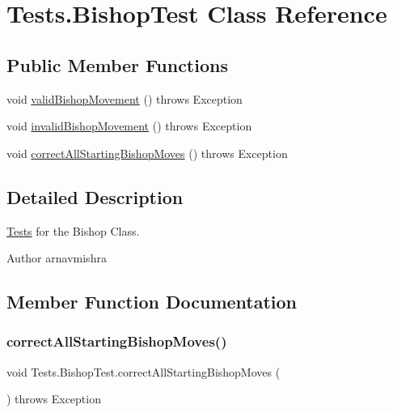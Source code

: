 \hypertarget{class_tests_1_1_bishop_test}{}\section{Tests.\+Bishop\+Test Class Reference}
\label{class_tests_1_1_bishop_test}
\subsection*{Public Member Functions}
\begin{DoxyCompactItemize}
\item 
void \hyperlink{class_tests_1_1_bishop_test_a5966af2d7a4cf4409a7c9e04e14be402}{valid\+Bishop\+Movement} ()  throws Exception 
\item 
void \hyperlink{class_tests_1_1_bishop_test_a3f1b2164ce04847f236b47960a2d6507}{invalid\+Bishop\+Movement} ()  throws Exception 
\item 
void \hyperlink{class_tests_1_1_bishop_test_a1635821930e814400c61693e0e65150c}{correct\+All\+Starting\+Bishop\+Moves} ()  throws Exception 
\end{DoxyCompactItemize}


\subsection{Detailed Description}
\hyperlink{namespace_tests}{Tests} for the Bishop Class. \begin{DoxyAuthor}{Author}
arnavmishra 
\end{DoxyAuthor}


\subsection{Member Function Documentation}
\hypertarget{class_tests_1_1_bishop_test_a1635821930e814400c61693e0e65150c}{}\label{class_tests_1_1_bishop_test_a1635821930e814400c61693e0e65150c} 
\subsubsection{\texorpdfstring{correct\+All\+Starting\+Bishop\+Moves()}{correctAllStartingBishopMoves()}}
{\footnotesize\ttfamily void Tests.\+Bishop\+Test.\+correct\+All\+Starting\+Bishop\+Moves (\begin{DoxyParamCaption}{ }\end{DoxyParamCaption}) throws Exception}

